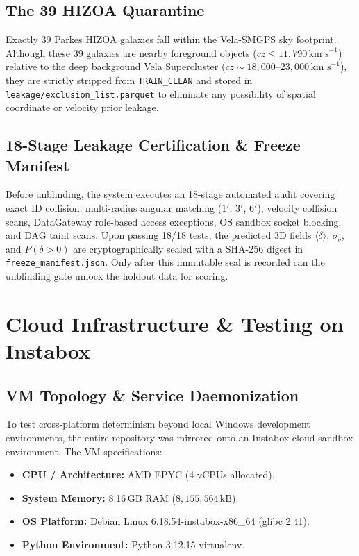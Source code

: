 \documentclass[11pt,a4paper]{article}
\begin{document}
\subsection{The 39 HIZOA Quarantine}
Exactly 39 Parkes HIZOA galaxies fall within the Vela-SMGPS sky footprint. Although these 39 galaxies are nearby foreground objects ($cz \le 11,790\,\text{km s}^{-1}$) relative to the deep background Vela Supercluster ($cz \sim 18,000\text{--}23,000\,\text{km s}^{-1}$), they are strictly stripped from \texttt{TRAIN\_CLEAN} and stored in \texttt{leakage/exclusion\_list.parquet} to eliminate any possibility of spatial coordinate or velocity prior leakage.

\subsection{18-Stage Leakage Certification \& Freeze Manifest}
Before unblinding, the system executes an 18-stage automated audit covering exact ID collision, multi-radius angular matching ($1'$, $3'$, $6'$), velocity collision scans, DataGateway role-based access exceptions, OS sandbox socket blocking, and DAG taint scans. Upon passing 18/18 tests, the predicted 3D fields $\langle \delta \rangle$, $\sigma_\delta$, and $P(\delta > 0)$ are cryptographically sealed with a SHA-256 digest in \texttt{freeze\_manifest.json}. Only after this immutable seal is recorded can the unblinding gate unlock the holdout data for scoring.

\section{Cloud Infrastructure \& Testing on Instabox}

\subsection{VM Topology \& Service Daemonization}
To test cross-platform determinism beyond local Windows development environments, the entire repository was mirrored onto an Instabox cloud sandbox environment. The VM specifications:
\begin{itemize}
    \item \textbf{CPU / Architecture:} AMD EPYC (4 vCPUs allocated).
    \item \textbf{System Memory:} 8.16\,GB RAM ($8,155,564\,\text{kB}$).
    \item \textbf{OS Platform:} Debian Linux 6.18.54-instabox-x86\_64 (glibc 2.41).
    \item \textbf{Python Environment:} Python 3.12.15 virtualenv.
\end{itemize}
\end{document}
